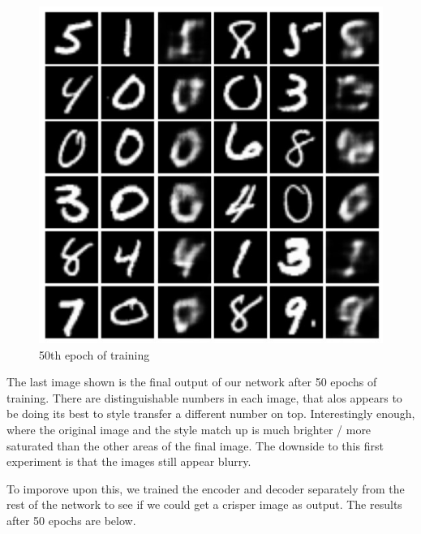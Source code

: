 \documentclass{article}
\begin{document}
\begin{figure}[hbt]
    \centering
    \includegraphics[scale=0.5]{images/EXP7_49.jpg}
    \caption{50th epoch of training}
    \label{fig:fig2}
\end{figure}

The last image shown is the final output of our network after 50 epochs of training. There are distinguishable
numbers in each image, that alos appears to be doing its best to style transfer a different number on top.
Interestingly enough, where the original image and the style match up is much brighter / more saturated than 
the other areas of the final image. The downside to this first experiment is that the images still appear blurry.
\clearpage

To imporove upon this, we trained the encoder and decoder separately from the rest of the network to see if we could get a
crisper image as output. The results after 50 epochs are below.
\end{document}
